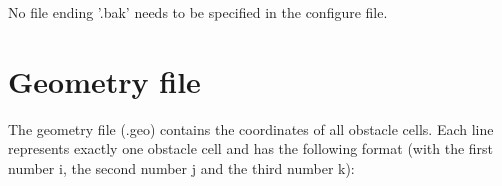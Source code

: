 
\noii No file ending '.bak' needs to be specified in the configure file.


\clearpage

\section{Geometry file} %
\label{sec:geometry_file}

The geometry file (.geo) contains the coordinates of all obstacle cells. Each line represents exactly one obstacle cell and has the following format (with the first number i, the second number j and the third number k):


